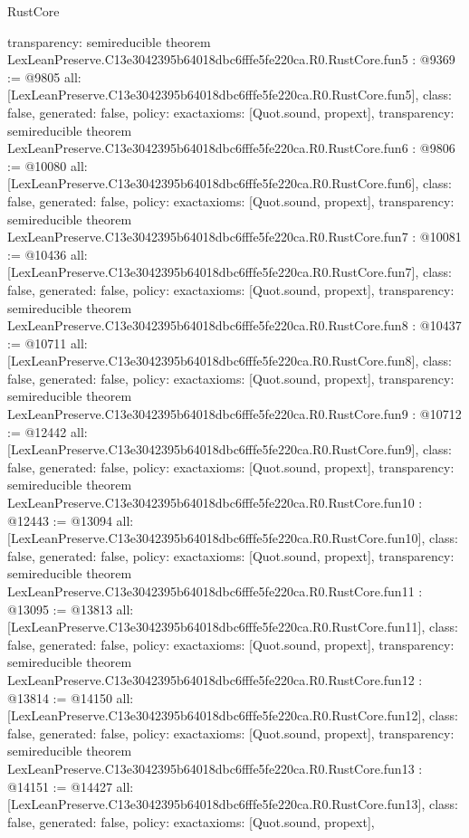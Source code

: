 \begin{lexlean}{RustCore}
\begin{coremodule}
{  transparency: semireducible
}
theorem LexLeanPreserve.C13e3042395b64018dbc6fffe5fe220ca.R0.RustCore.fun5 : @9369 := @9805 {
  all: [LexLeanPreserve.C13e3042395b64018dbc6fffe5fe220ca.R0.RustCore.fun5],
  class: false,
  generated: false,
  policy: exact{axioms: [Quot.sound, propext]},
  transparency: semireducible
}
theorem LexLeanPreserve.C13e3042395b64018dbc6fffe5fe220ca.R0.RustCore.fun6 : @9806 := @10080 {
  all: [LexLeanPreserve.C13e3042395b64018dbc6fffe5fe220ca.R0.RustCore.fun6],
  class: false,
  generated: false,
  policy: exact{axioms: [Quot.sound, propext]},
  transparency: semireducible
}
theorem LexLeanPreserve.C13e3042395b64018dbc6fffe5fe220ca.R0.RustCore.fun7 : @10081 := @10436 {
  all: [LexLeanPreserve.C13e3042395b64018dbc6fffe5fe220ca.R0.RustCore.fun7],
  class: false,
  generated: false,
  policy: exact{axioms: [Quot.sound, propext]},
  transparency: semireducible
}
theorem LexLeanPreserve.C13e3042395b64018dbc6fffe5fe220ca.R0.RustCore.fun8 : @10437 := @10711 {
  all: [LexLeanPreserve.C13e3042395b64018dbc6fffe5fe220ca.R0.RustCore.fun8],
  class: false,
  generated: false,
  policy: exact{axioms: [Quot.sound, propext]},
  transparency: semireducible
}
theorem LexLeanPreserve.C13e3042395b64018dbc6fffe5fe220ca.R0.RustCore.fun9 : @10712 := @12442 {
  all: [LexLeanPreserve.C13e3042395b64018dbc6fffe5fe220ca.R0.RustCore.fun9],
  class: false,
  generated: false,
  policy: exact{axioms: [Quot.sound, propext]},
  transparency: semireducible
}
theorem LexLeanPreserve.C13e3042395b64018dbc6fffe5fe220ca.R0.RustCore.fun10 : @12443 := @13094 {
  all: [LexLeanPreserve.C13e3042395b64018dbc6fffe5fe220ca.R0.RustCore.fun10],
  class: false,
  generated: false,
  policy: exact{axioms: [Quot.sound, propext]},
  transparency: semireducible
}
theorem LexLeanPreserve.C13e3042395b64018dbc6fffe5fe220ca.R0.RustCore.fun11 : @13095 := @13813 {
  all: [LexLeanPreserve.C13e3042395b64018dbc6fffe5fe220ca.R0.RustCore.fun11],
  class: false,
  generated: false,
  policy: exact{axioms: [Quot.sound, propext]},
  transparency: semireducible
}
theorem LexLeanPreserve.C13e3042395b64018dbc6fffe5fe220ca.R0.RustCore.fun12 : @13814 := @14150 {
  all: [LexLeanPreserve.C13e3042395b64018dbc6fffe5fe220ca.R0.RustCore.fun12],
  class: false,
  generated: false,
  policy: exact{axioms: [Quot.sound, propext]},
  transparency: semireducible
}
theorem LexLeanPreserve.C13e3042395b64018dbc6fffe5fe220ca.R0.RustCore.fun13 : @14151 := @14427 {
  all: [LexLeanPreserve.C13e3042395b64018dbc6fffe5fe220ca.R0.RustCore.fun13],
  class: false,
  generated: false,
  policy: exact{axioms: [Quot.sound, propext]},
}
\end{coremodule}
\end{lexlean}
